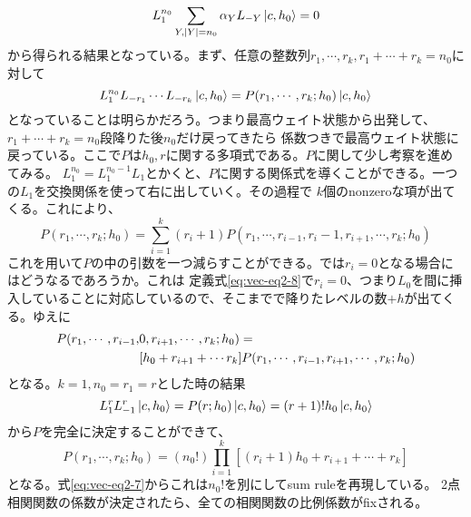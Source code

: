 \documentclass[11pt, aps, longbibliography]{article}
\numberwithin{equation}{section}
\begin{document}
        \begin{equation}\label{eq:vec-eq2-7}
            L_1^{n_0} \sum_{Y,|Y|=n_0}\alpha_Y L_{-Y}\ket{c,h_0} = 0
        \end{equation}
        から得られる結果となっている。まず、任意の整数列$r_1,\cdots,r_k, r_1 + \cdots + r_k=n_0$に対して
        \begin{equation}\label{eq:vec-eq2-8}
            L_1^{n_0}L_{-r_1}\cdots L_{-r_k}\ket{c,h_0} = P(r_1,\cdots,r_k;h_0)\ket{c,h_0}
        \end{equation}
        となっていることは明らかだろう。つまり最高ウェイト状態から出発して、$r_1 + \cdots + r_k=n_0$段降りた後$n_0$だけ戻ってきたら
        係数つきで最高ウェイト状態に戻っている。ここで$P$は$h_0,r$に関する多項式である。$P$に関して少し考察を進めてみる。
        $L_1^{n_0}=L_1^{n_0-1}L_1$とかくと、$P$に関する関係式を導くことができる。一つの$L_1$を交換関係を使って右に出していく。その過程で
        $k$個のnonzeroな項が出てくる。これにより、
        \begin{equation}\label{eq:vec-eq2-9}
            P(r_1,\cdots,r_k;h_0) = \sum_{i=1}^k (r_i+1)P(r_1,\cdots,r_{i-1},r_i-1,r_{i+1},\cdots,r_k;h_0)
        \end{equation}
        これを用いて$P$の中の引数を一つ減らすことができる。では$r_i=0$となる場合にはどうなるであろうか。これは
        定義式\eqref{eq:vec-eq2-8}で$r_i=0$、つまり$L_0$を間に挿入していることに対応しているので、そこまでで降りたレベルの数$+h$が出てくる。ゆえに
        \begin{align}\label{eq:vec-eq2-10}
            P(r_1,\cdots,r_{i-1},&0,r_{i+1},\cdots,r_k;h_0) = \notag \\
            &[h_0 + r_{i+1} + \cdots r_k]P(r_1,\cdots,r_{i-1},r_{i+1},\cdots,r_k;h_0)
        \end{align}
        となる。$k=1,n_0=r_1=r$とした時の結果
        \begin{equation}\label{eq:vec-eq2-11}
            L_1^rL_{-1}^r\ket{c,h_0} = P(r;h_0)\ket{c,h_0} = (r+1)!h_0\ket{c,h_0}
        \end{equation}
        から$P$を完全に決定することができて、
        \begin{equation}\label{eq:vec-eq2-12}
            P(r_1,\cdots,r_k;h_0) = (n_0!)\prod_{i=1}^k [(r_i+1)h_0 + r_{i+1} + \cdots + r_k]
        \end{equation}
        となる。式\eqref{eq:vec-eq2-7}からこれは$n_0!$を別にしてsum ruleを再現している。
        2点相関関数の係数が決定されたら、全ての相関関数の比例係数がfixされる。
\end{document}
